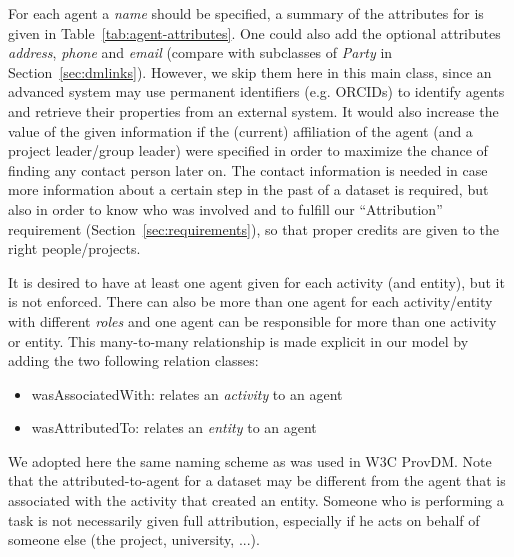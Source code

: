 For each agent a \emph{name} should be specified, a summary of the attributes for  is given in Table~\ref{tab:agent-attributes}.
One could also add the optional attributes \emph{address}, \emph{phone} and \emph{email} (compare with subclasses of \emph{Party} in Section~\ref{sec:dmlinks}). However, we skip them here in this main class, since an advanced system may use permanent identifiers (e.g. ORCIDs) to identify agents and retrieve their properties from an external system.
It would also increase the value of the given
information if the (current) affiliation of the agent (and a project leader/group
leader) were specified in order to maximize the chance of finding any contact 
person later on. 
The contact information is needed in case more information about a certain step in the past of a dataset is required,
but also in order
to know who was involved and to fulfill our ``Attribution'' requirement 
(Section~\ref{sec:requirements}), so that proper credits are given to the right 
people/projects. 



It is desired to have at least one agent given for each activity (and entity), but it
is not enforced.
There can also be more than one agent for each activity/entity with different \emph{roles} 
and one agent can be responsible for more than one activity or entity. This 
many-to-many relationship is made explicit in our model by adding the two
following relation classes:

\begin{itemize}
\item wasAssociatedWith: relates an \emph{activity} to an agent
\item wasAttributedTo: relates an \emph{entity} to an agent
\end{itemize}

We adopted here the same naming scheme as was used in W3C ProvDM.
Note that the attributed-to-agent for a dataset may be different from the 
agent that is associated with the activity that created an entity.
Someone who is performing a task is not necessarily given full attribution, 
especially if he acts on behalf of someone else (the project, university, ...).


